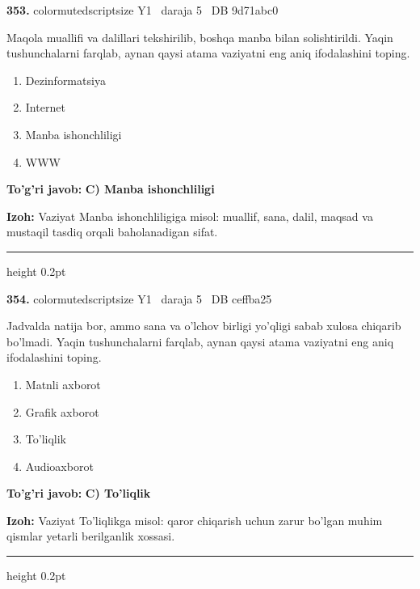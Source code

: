 \documentclass[10pt,a4paper,oneside]{article}
\begin{document}
\noindent\textbf{\color{ink}353.}  {color{muted}scriptsize Y1 \textbullet\ daraja 5 \textbullet\ DB 9d71abc0}
\par
Maqola muallifi va dalillari tekshirilib, boshqa manba bilan solishtirildi. Yaqin tushunchalarni farqlab, aynan qaysi atama vaziyatni eng aniq ifodalashini toping.
\begin{enumerate}[label=\Alph*),leftmargin=9mm]
\item Dezinformatsiya
\item Internet
\item Manba ishonchliligi
\item WWW
\end{enumerate}
\begin{tcolorbox}[enhanced,breakable,colback=teal!4,colframe=teal!50!black,boxrule=0.5pt,arc=1.1mm,left=3mm,right=3mm,top=1.7mm,bottom=1.7mm,before skip=2mm,after skip=2mm]
\textbf{\color{teal}To'g'ri javob:} \textbf{C) Manba ishonchliligi}
\par\smallskip
\textbf{Izoh:} Vaziyat Manba ishonchliligiga misol: muallif, sana, dalil, maqsad va mustaqil tasdiq orqali baholanadigan sifat.
\end{tcolorbox}
\vspace{2mm}\hrule height 0.2pt \vspace{3mm}

\noindent\textbf{\color{ink}354.}  {color{muted}scriptsize Y1 \textbullet\ daraja 5 \textbullet\ DB ceffba25}
\par
Jadvalda natija bor, ammo sana va o'lchov birligi yo'qligi sabab xulosa chiqarib bo'lmadi. Yaqin tushunchalarni farqlab, aynan qaysi atama vaziyatni eng aniq ifodalashini toping.
\begin{enumerate}[label=\Alph*),leftmargin=9mm]
\item Matnli axborot
\item Grafik axborot
\item To'liqlik
\item Audioaxborot
\end{enumerate}
\begin{tcolorbox}[enhanced,breakable,colback=teal!4,colframe=teal!50!black,boxrule=0.5pt,arc=1.1mm,left=3mm,right=3mm,top=1.7mm,bottom=1.7mm,before skip=2mm,after skip=2mm]
\textbf{\color{teal}To'g'ri javob:} \textbf{C) To'liqlik}
\par\smallskip
\textbf{Izoh:} Vaziyat To'liqlikga misol: qaror chiqarish uchun zarur bo'lgan muhim qismlar yetarli berilganlik xossasi.
\end{tcolorbox}
\vspace{2mm}\hrule height 0.2pt \vspace{3mm}
\end{document}

